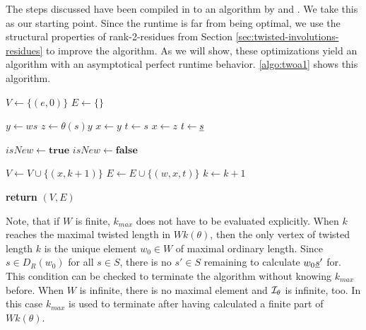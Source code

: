 The steps discussed have been compiled in to an algorithm by \cite[Algorithm 2.4]{brennemann:twoa} and \cite[Algorithm 3.1.1]{haas:twoa}. We take this as our starting point. Since the runtime is far from being optimal, we use the structural properties of rank-2-residues from Section \ref{sec:twisted-involutions-residues} to improve the algorithm. As we will show, these optimizations yield an algorithm with an asymptotical perfect runtime behavior. \ref{algo:twoa1} shows this algorithm.

\begin{algo}[TWOA1]
	\hfill
	\begin{algorithmic}[1]
	\State $V \gets \{(e,0)\}$
	\State $E \gets \{\}$

	 \label{algo:twoa1-k-loop}
		 \label{algo:twoa1-v-loop}
			 \label{algo:twoa1-s-loop} 
				\State $y \gets ws$
				\State $z \gets \theta(s)y$
				 \label{algo:twoa1-check-one-or-bothsided}
					\State $x \gets y$
					\State $t \gets s$
				\Else
					\State $x \gets z$
					\State $t \gets \underline{s}$
				\EndIf
				
				\State $isNew \gets \textbf{true}$
				 \label{algo:twoa1-comp} 
						\State $isNew \gets \textbf{false}$
					\EndIf
				\EndFor
				
					\State $V \gets V \cup \{ (x,k+1) \}$
				\EndIf
				\State $E \gets E \cup \{ (w,x,t) \}$
			\EndFor
		\EndFor
		\State $k \gets k + 1$
	\EndFor

	\State \textbf{return} $(V,E)$
	\EndProcedure
	\end{algorithmic}
\end{algo}

Note, that if $W$ is finite, $k_{max}$ does not have to be evaluated explicitly. When $k$ reaches the maximal twisted length in $Wk(\theta)$, then the only vertex of twisted length $k$ is the unique element $w_0 \in W$ of maximal ordinary length. Since $s \in D_R(w_0)$ for all $s \in S$, there is no $s' \in S$ remaining to calculate $w_0 \underline{s}'$ for. This condition can be checked to terminate the algorithm without knowing $k_{max}$ before. When $W$ is infinite, there is no maximal element and $\mathcal{I}_{\theta}$ is infinite, too. In this case $k_{max}$ is used to terminate after having calculated a finite part of $Wk(\theta)$.

